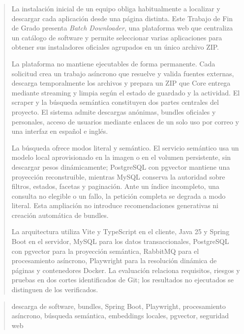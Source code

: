 \documentclass[a4paper,12pt,oneside]{memoir}
\begin{document}
\newpage\null\thispagestyle{empty}\newpage




\frontmatter

\renewcommand*\abstractname{Resumen}
\begin{abstract}
La instalación inicial de un equipo obliga habitualmente a localizar y descargar cada aplicación desde una página distinta. Este Trabajo de Fin de Grado presenta \emph{Batch Downloader}, una plataforma web que centraliza un catálogo de software y permite seleccionar varias aplicaciones para obtener sus instaladores oficiales agrupados en un único archivo ZIP.

La plataforma no mantiene ejecutables de forma permanente. Cada solicitud crea un trabajo asíncrono que resuelve y valida fuentes externas, descarga temporalmente los archivos y prepara un ZIP que Core entrega mediante streaming y limpia según el estado de guardado y la actividad. El scraper y la búsqueda semántica constituyen dos partes centrales del proyecto. El sistema admite descargas anónimas, bundles oficiales y personales, acceso de usuarios mediante enlaces de un solo uso por correo y una interfaz en español e inglés.

La búsqueda ofrece modos literal y semántico. El servicio semántico usa un modelo local aprovisionado en la imagen o en el volumen persistente, sin descargar pesos dinámicamente; PostgreSQL con pgvector mantiene una proyección reconstruible, mientras MySQL conserva la autoridad sobre filtros, estados, facetas y paginación. Ante un índice incompleto, una consulta no elegible o un fallo, la petición completa se degrada a modo literal. Esta ampliación no introduce recomendaciones generativas ni creación automática de bundles.

La arquitectura utiliza Vite y TypeScript en el cliente, Java 25 y Spring Boot en el servidor, MySQL para los datos transaccionales, PostgreSQL con pgvector para la proyección semántica, RabbitMQ para el procesamiento asíncrono, Playwright para la resolución dinámica de páginas y contenedores Docker. La evaluación relaciona requisitos, riesgos y pruebas en dos cortes identificados de Git; los resultados no ejecutados se distinguen de los verificados.
\end{abstract}

\renewcommand*\abstractname{Descriptores}
\begin{abstract}
descarga de software, bundles, Spring Boot, Playwright, procesamiento asíncrono, búsqueda semántica, embeddings locales, pgvector, seguridad web
\end{abstract}
\end{document}
